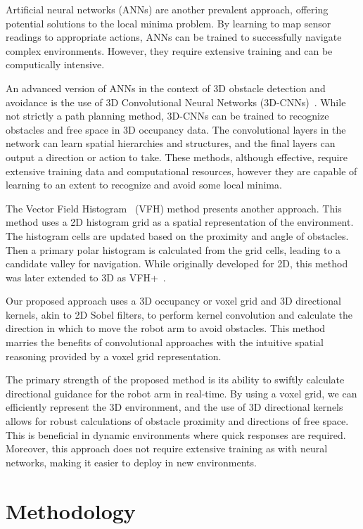\documentclass[a4paper]{article}
\begin{document}
Artificial neural networks (ANNs) are another prevalent approach, offering potential solutions to the local minima problem. By learning to map sensor readings to appropriate actions, ANNs can be trained to successfully navigate complex environments. However, they require extensive training and can be computically intensive.

An advanced version of ANNs in the context of 3D obstacle detection and avoidance is the use of 3D Convolutional Neural Networks (3D-CNNs)~\cite{Duguleana2011}. While not strictly a path planning method, 3D-CNNs can be trained to recognize obstacles and free space in 3D occupancy data. The convolutional layers in the network can learn spatial hierarchies and structures, and the final layers can output a direction or action to take. These methods, although effective, require extensive training data and computational resources, however they are capable of learning to an extent to recognize and avoid some local minima. 

The Vector Field Histogram~\cite{Borenstein1991} (VFH) method presents another approach. This method uses a 2D histogram grid as a spatial representation of the environment. The histogram cells are updated based on the proximity and angle of obstacles. Then a primary polar histogram is calculated from the grid cells, leading to a candidate valley for navigation. While originally developed for 2D, this method was later extended to 3D as VFH+~\cite{Ulrich1998}.

Our proposed approach uses a 3D occupancy or voxel grid and 3D directional kernels, akin to 2D Sobel filters, to perform kernel convolution and calculate the direction in which to move the robot arm to avoid obstacles. This method marries the benefits of convolutional approaches with the intuitive spatial reasoning provided by a voxel grid representation.

The primary strength of the proposed method is its ability to swiftly calculate directional guidance for the robot arm in real-time. By using a voxel grid, we can efficiently represent the 3D environment, and the use of 3D directional kernels allows for robust calculations of obstacle proximity and directions of free space. This is beneficial in dynamic environments where quick responses are required. Moreover, this approach does not require extensive training as with neural networks, making it easier to deploy in new environments. 

\section{Methodology}
\end{document}
